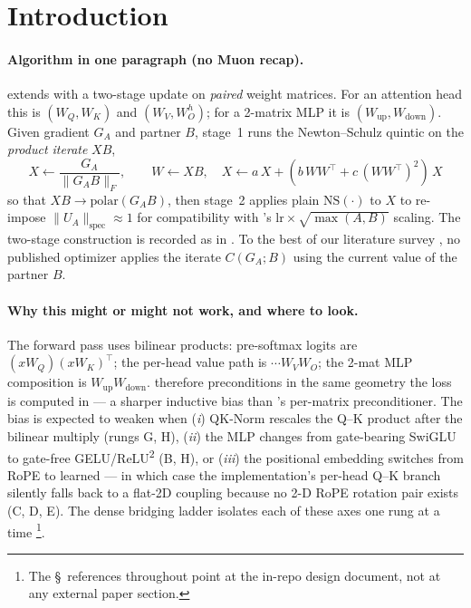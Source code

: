 \section{Introduction}\label{sec:intro}

\paragraph{Algorithm in one paragraph (no Muon recap).}
\optCoupled{} extends \optMuon{} \citep{bernstein2024oonn} with a two-stage update on \emph{paired} weight matrices. For an attention head this is $(W_Q, W_K)$ and $(W_V, W_O^{h})$; for a 2-matrix MLP it is $(W_{\text{up}}, W_{\text{down}})$. Given gradient $G_A$ and partner $B$, stage~1 runs the Newton--Schulz quintic on the \emph{product iterate} $X B$,
\begin{equation}\label{eq:two_stage}
X \leftarrow \frac{G_A}{\lVert G_A B \rVert_F},\qquad
W \leftarrow X B,\quad
X \leftarrow a\,X + (b\,W W^{\top} + c\,(W W^{\top})^2)\,X
\end{equation}
so that $X B \rightarrow \mathrm{polar}(G_A B)$, then stage~2 applies plain $\mathrm{NS}(\cdot)$ to $X$ to re-impose $\lVert U_A \rVert_{\text{spec}} \approx 1$ for compatibility with \optMuon{}'s $\mathrm{lr} \times \sqrt{\max(A,B)}$ scaling. The two-stage construction is recorded as  in . To the best of our literature survey \citep{bernstein2024oonn,bernstein2024modular,liu2025moonlight,lau2025polargrad}, no published optimizer applies the iterate $C(G_A;B)$ using the current value of the partner $B$.

\paragraph{Why this might or might not work, and where to look.}
The forward pass uses bilinear products: pre-softmax logits are $(xW_Q)(xW_K)^{\top}$; the per-head value path is $\cdots W_V W_O$; the 2-mat MLP composition is $W_{\text{up}} W_{\text{down}}$. \optCoupled{} therefore preconditions in the same geometry the loss is computed in --- a sharper inductive bias than \optMuon{}'s per-matrix preconditioner. The bias is expected to weaken when (\emph{i}) QK-Norm rescales the Q--K product after the bilinear multiply (rungs G, H), (\emph{ii}) the MLP changes from gate-bearing SwiGLU to gate-free GELU/ReLU\textsuperscript{2} (B, H), or (\emph{iii}) the positional embedding switches from RoPE to learned --- in which case the implementation's per-head Q--K branch silently falls back to a flat-2D coupling because no 2-D RoPE rotation pair exists (C, D, E). The dense bridging ladder isolates each of these axes one rung at a time \citep[\S d.2]{karpathy2023nanogpt}\footnote{The \S~references throughout point at the in-repo  design document, not at any external paper section.}.

